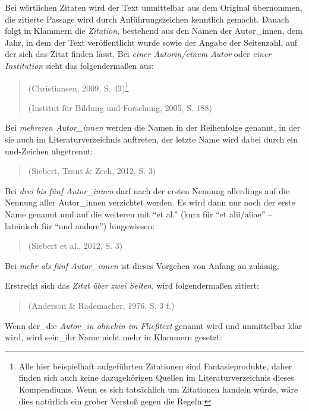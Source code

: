 \documentclass[ngerman,bibliography=totoc,oneside,12pt,a4paper]{scrbook}
\begin{document}
Bei wörtlichen Zitaten wird der Text unmittelbar aus dem Original
übernommen, die zitierte Passage wird durch Anführungszeichen kenntlich
gemacht. Danach folgt in Klammern die \emph{Zitation}, bestehend aus den
Namen der Autor\_innen, dem Jahr, in dem der Text veröffentlicht wurde
sowie der Angabe der Seitenzahl, auf der sich das Zitat finden lässt.
Bei \emph{einer Autorin/einem Autor} oder \emph{einer Institution} sieht
das folgendermaßen aus:

\begin{quote}
(Christiansen, 2009, S. 43)\footnote{Alle hier beispielhaft aufgeführten
  Zitationen sind Fantasieprodukte, daher finden sich auch keine
  dazugehörigen Quellen im Literaturverzeichnis dieses Kompendiums. Wenn
  es sich tatsächlich um Zitationen handeln würde, wäre dies natürlich
  ein grober Verstoß gegen die Regeln.}

(Institut für Bildung und Forschung, 2005, S. 188)
\end{quote}

Bei \emph{mehreren Autor\_innen} werden die Namen in der Reihenfolge
genannt, in der sie auch im Literaturverzeichnis auftreten, der letzte
Name wird dabei durch ein und-Zeichen abgetrennt:

\begin{quote}
(Siebert, Traut \& Zech, 2012, S. 3)
\end{quote}

Bei \emph{drei bis fünf Autor\_innen} darf nach der ersten Nennung
allerdings auf die Nennung aller Autor\_innen verzichtet werden. Es wird
dann nur noch der erste Name genannt und auf die weiteren mit
\enquote{et al.} (kurz für \enquote{et alii/aliae} -- lateinisch für
\enquote{und andere}) hingewiesen:

\begin{quote}
(Siebert et al., 2012, S. 3)
\end{quote}

Bei \emph{mehr als fünf Autor\_innen} ist dieses Vorgehen von Anfang an
zulässig.

Erstreckt sich das \emph{Zitat über zwei Seiten}, wird folgendermaßen
zitiert:

\begin{quote}
(Anderson \& Rademacher, 1976, S. 3 f.)
\end{quote}

Wenn der\_die \emph{Autor\_in ohnehin im Fließtext} genannt wird und
unmittelbar klar wird, wird sein\_ihr Name nicht mehr in Klammern
gesetzt:
\end{document}
